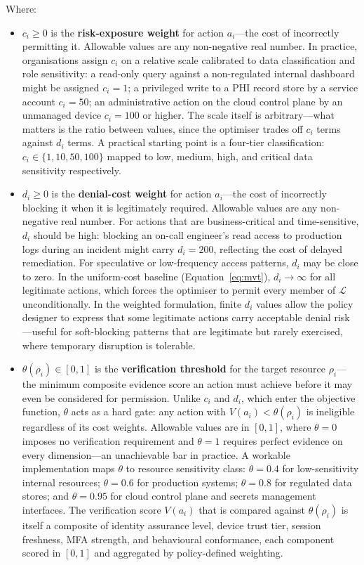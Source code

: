 \documentclass[unnumsec,webpdf,contemporary,large]{oup-authoring-template}
\theoremstyle{thmstyleone}
\theoremstyle{thmstyletwo}
\theoremstyle{thmstylethree}
\begin{document}
\begin{appendices}
Where:
\begin{itemize}

\item $c_i \geq 0$ is the \textbf{risk-exposure weight} for action $a_i$---the cost
of incorrectly permitting it. Allowable values are any non-negative real number.
In practice, organisations assign $c_i$ on a relative scale calibrated to data
classification and role sensitivity: a read-only query against a non-regulated
internal dashboard might be assigned $c_i = 1$; a privileged write to a PHI
record store by a service account $c_i = 50$; an administrative action on the
cloud control plane by an unmanaged device $c_i = 100$ or higher. The scale
itself is arbitrary---what matters is the ratio between values, since the
optimiser trades off $c_i$ terms against $d_i$ terms. A practical starting
point is a four-tier classification: $c_i \in \{1, 10, 50, 100\}$ mapped to
low, medium, high, and critical data sensitivity respectively.

\item $d_i \geq 0$ is the \textbf{denial-cost weight} for action $a_i$---the cost
of incorrectly blocking it when it is legitimately required. Allowable values are
any non-negative real number. For actions that are business-critical and
time-sensitive, $d_i$ should be high: blocking an on-call engineer's read access
to production logs during an incident might carry $d_i = 200$, reflecting the
cost of delayed remediation. For speculative or low-frequency access patterns,
$d_i$ may be close to zero. In the uniform-cost baseline (Equation~\ref{eq:mvt}),
$d_i \to \infty$ for all legitimate actions, which forces the optimiser to
permit every member of $\mathcal{L}$ unconditionally. In the weighted
formulation, finite $d_i$ values allow the policy designer to express that some
legitimate actions carry acceptable denial risk---useful for soft-blocking
patterns that are legitimate but rarely exercised, where temporary disruption
is tolerable.

\item $\theta(\rho_i) \in [0, 1]$ is the \textbf{verification threshold} for the
target resource $\rho_i$---the minimum composite evidence score an action must
achieve before it may even be considered for permission. Unlike $c_i$ and $d_i$,
which enter the objective function, $\theta$ acts as a hard gate: any action
with $V(a_i) < \theta(\rho_i)$ is ineligible regardless of its cost weights.
Allowable values are in $[0, 1]$, where $\theta = 0$ imposes no verification
requirement and $\theta = 1$ requires perfect evidence on every dimension---an
unachievable bar in practice. A workable implementation maps $\theta$ to
resource sensitivity class: $\theta = 0.4$ for low-sensitivity internal
resources; $\theta = 0.6$ for production systems; $\theta = 0.8$ for regulated
data stores; and $\theta = 0.95$ for cloud control plane and secrets management
interfaces. The verification score $V(a_i)$ that is compared against
$\theta(\rho_i)$ is itself a composite of identity assurance level, device
trust tier, session freshness, MFA strength, and behavioural conformance, each
component scored in $[0, 1]$ and aggregated by policy-defined weighting.


\end{itemize}
\end{appendices}
\end{document}

